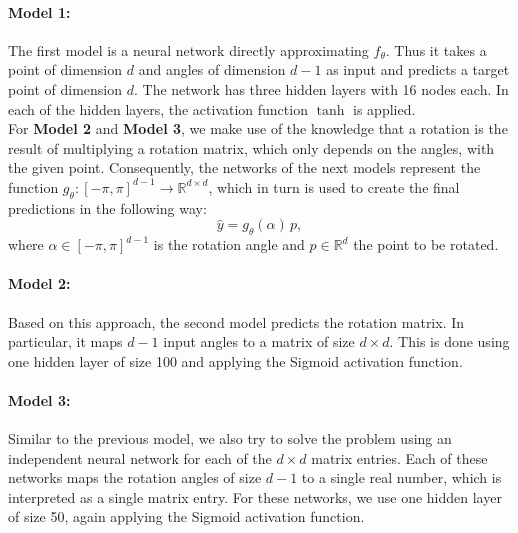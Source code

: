 \paragraph{Model 1:}The first model is a neural network directly approximating $f_\theta$. Thus it takes a point of dimension $d$ and angles of dimension $d-1$ as input and predicts a target point of dimension $d$. The network has three hidden layers with 16 nodes each. In each of the hidden layers, the activation function $\tanh$ is applied.\\

For \textbf{Model 2} and \textbf{Model 3}, we make use of the knowledge that a rotation is the result of multiplying a rotation matrix, which only depends on the angles, with the given point. Consequently, the networks of the next models represent the function $g_\theta: [-\pi, \pi]^{d-1} \to \mathbb{R}^{d \times d}$, which in turn is used to create the final predictions in the following way:
\begin{equation}
\label{eq:rot_pred}
\hat{y} = g_\theta(\alpha) \, p,
\end{equation}
where $\alpha \in [-\pi, \pi]^{d-1}$ is the rotation angle and $p \in \mathbb{R}^d$ the point to be rotated.

\paragraph{Model 2:} Based on this approach, the second model predicts the rotation matrix. In particular, it maps $d-1$ input angles to a matrix of size $d \times d$. This is done using one hidden layer of size 100 and applying the Sigmoid activation function. 

\paragraph{Model 3:} Similar to the previous model, we also try to solve the problem using an independent neural network for each of the $d \times d$ matrix entries. Each of these networks maps the rotation angles of size $d-1$ to a single real number, which is interpreted as a single matrix entry. For these networks, we use one hidden layer of size 50, again applying the Sigmoid activation function.\\

